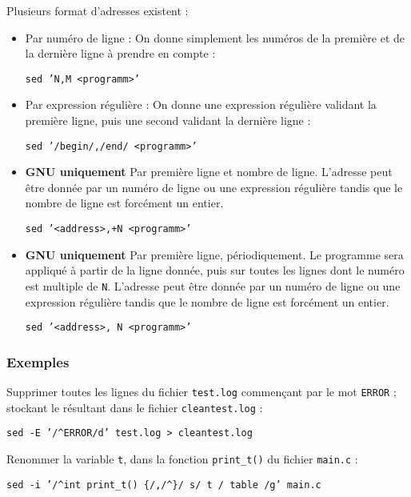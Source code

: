 Plusieurs format d'adresses existent : 
\begin{itemize}
    \item Par numéro de ligne : On donne simplement les numéros de la première et de la dernière ligne à prendre en compte : 
        \begin{nscenter}
            \texttt{sed 'N,M <programm>'}
        \end{nscenter}
    \item Par expression régulière : On donne une expression régulière validant la première ligne, puis une second validant la dernière ligne :
        \begin{nscenter}
            \texttt{sed '/begin/,/end/ <programm>'}
        \end{nscenter}
    \item \textbf{GNU  uniquement} Par première ligne et nombre de ligne. L'adresse peut être donnée par un numéro de ligne ou une expression régulière tandis que le nombre de ligne est forcément un entier.
        \begin{nscenter}
            \texttt{sed '<address>,+N <programm>'}
        \end{nscenter}
    \item \textbf{GNU  uniquement} Par première ligne, périodiquement.  Le programme sera appliqué à partir de la ligne donnée, puis sur toutes les lignes dont le numéro est multiple de \texttt{N}. L'adresse peut être donnée par un numéro de ligne ou une expression régulière tandis que le nombre de ligne est forcément un entier.
        \begin{nscenter}
            \texttt{sed '<address>,~N <programm>'}
        \end{nscenter}
\end{itemize}

\subsubsection{Exemples}

Supprimer toutes les lignes du fichier \texttt{test.log} commençant par le mot \texttt{ERROR} ; stockant le résultant dans le fichier \texttt{cleantest.log} :
\begin{nscenter}
    \texttt{sed -E '/^ERROR/d' test.log > cleantest.log}
\end{nscenter}

Renommer la variable \texttt{t}, dans la fonction \texttt{print\_t()} du fichier \texttt{main.c} :
\begin{nscenter}
    \texttt{sed -i '/^int print_t() \{/,/^\}/ s/ t / table /g' main.c}
\end{nscenter}

